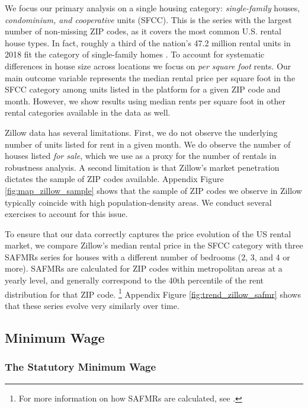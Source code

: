 We focus our primary analysis on a single housing category:
\textit{single-family} houses, \textit{condominium, and cooperative} units (SFCC).
This is the series with the largest number of non-missing ZIP codes, as it 
covers the most common U.S. rental house types.
In fact, roughly a third of the nation's 47.2 million rental units in 2018 fit 
the category of single-family homes \parencite{Fernald2020}.
To account for systematic differences in house size across locations we focus 
on \textit{per square foot} rents.
Our main outcome variable represents the median rental price per square foot in 
the SFCC category among units listed in the platform for a given ZIP code and 
month.
However, we show results using median rents per square foot in other rental 
categories available in the data as well.

Zillow data has several limitations.
First, we do not observe the underlying number of units listed for rent in a 
given month.
We do observe the number of houses listed \textit{for sale}, which we use as a
proxy for the number of rentals in robustness analysis.
A second limitation is that Zillow's market penetration dictates the sample of 
ZIP codes available.
Appendix Figure \ref{fig:map_zillow_sample} shows that the sample of ZIP codes
we observe in Zillow typically coincide with high population-density areas.
We conduct several exercises to account for this issue.

To ensure that our data correctly captures the price evolution of the US rental 
market, we compare 
Zillow's median rental price in the SFCC category with 
three SAFMRs series for houses with a different number of bedrooms (2, 3, and 
4 or more).
SAFMRs are calculated for ZIP codes within metropolitan areas at a yearly level, 
and generally correspond to the 40th percentile of the rent distribution for 
that ZIP code.%
\footnote{For more information on how SAFMRs are calculated, see 
\textcite[][page 41641]{hudPreamble}.}
Appendix Figure \ref{fig:trend_zillow_safmr} shows that these series evolve
very similarly over time.

\subsection{Minimum Wage}\label{sec:mw_construction}

\subsubsection*{The Statutory Minimum Wage}

